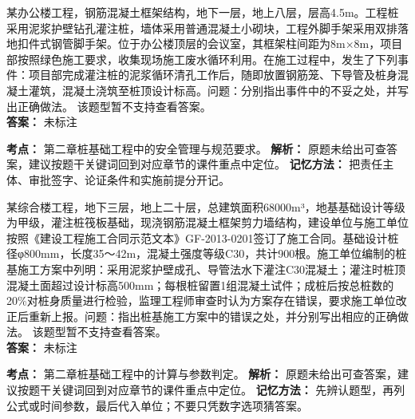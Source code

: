 \documentclass[UTF8,fontset=fandol,11pt]{ctexart}
\begin{document}
\vspace{0.2em}

\begin{quizbox}[title={第 13 题}]
某办公楼工程，钢筋混凝土框架结构，地下一层，地上八层，层高4.5m。工程桩采用泥浆护壁钻孔灌注桩，墙体采用普通混凝土小砌块，工程外脚手架采用双排落地扣件式钢管脚手架。位于办公楼顶层的会议室，其框架柱间距为8m×8m，项目部按照绿色施工要求，收集现场施工废水循环利用。在施工过程中，发生了下列事件：项目部完成灌注桩的泥浆循环清孔工作后，随即放置钢筋笼、下导管及桩身混凝土灌筑，混凝土浇筑至桩顶设计标高。问题：分别指出事件中的不妥之处，并写出正确做法。 该题型暂不支持查看答案。\\
\textbf{答案：} 未标注
\vspace{0.25em}
\begin{answerbox}[title={考点解析}]
\textbf{考点：} 第二章桩基础工程中的安全管理与规范要求。
\textbf{解析：} 原题未给出可查答案，建议按题干关键词回到对应章节的课件重点中定位。
\textbf{记忆方法：} 把责任主体、审批签字、论证条件和实施前提分开记。
\end{answerbox}
\end{quizbox}

\vspace{0.2em}

\begin{quizbox}[title={第 14 题}]
某综合楼工程，地下三层，地上二十层，总建筑面积68000m³，地基基础设计等级为甲级，灌注桩筏板基础，现浇钢筋混凝土框架剪力墙结构，建设单位与施工单位按照《建设工程施工合同示范文本》GF-2013-0201签订了施工合同。基础设计桩径φ800mm，长度35～42m，混凝土强度等级C30，共计900根。施工单位编制的桩基施工方案中列明：采用泥浆护壁成孔、导管法水下灌注C30混凝土；灌注时桩顶混凝土面超过设计标高500mm；每根桩留置1组混凝土试件；成桩后按总桩数的20\%对桩身质量进行检验，监理工程师审查时认为方案存在错误，要求施工单位改正后重新上报。问题：指出桩基施工方案中的错误之处，并分别写出相应的正确做法。 该题型暂不支持查看答案。\\
\textbf{答案：} 未标注
\vspace{0.25em}
\begin{answerbox}[title={考点解析}]
\textbf{考点：} 第二章桩基础工程中的计算与参数判定。
\textbf{解析：} 原题未给出可查答案，建议按题干关键词回到对应章节的课件重点中定位。
\textbf{记忆方法：} 先辨认题型，再列公式或时间参数，最后代入单位；不要只凭数字选项猜答案。
\end{answerbox}
\end{quizbox}

\vspace{0.2em}
\end{document}
